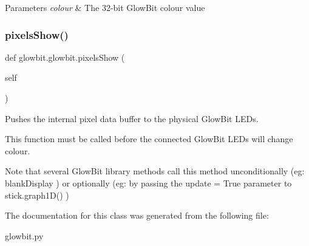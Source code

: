 \begin{DoxyParams}{Parameters}
{\em colour} & The 32-\/bit Glow\+Bit colour value \\
\hline
\end{DoxyParams}
\mbox{\label{classglowbit_1_1glowbit_a051aed2a4969fdcb0466e4e840209279}} 
\subsubsection{\texorpdfstring{pixels\+Show()}{pixelsShow()}}
{\footnotesize\ttfamily def glowbit.\+glowbit.\+pixels\+Show (\begin{DoxyParamCaption}\item[{}]{self }\end{DoxyParamCaption})}



Pushes the internal pixel data buffer to the physical Glow\+Bit L\+E\+Ds. 

This function must be called before the connected Glow\+Bit L\+E\+Ds will change colour.

Note that several Glow\+Bit library methods call this method unconditionally (eg\+: blank\+Display ) or optionally (eg\+: by passing the update = True parameter to stick.\+graph1\+D() ) 

The documentation for this class was generated from the following file\+:\begin{DoxyCompactItemize}
\item 
glowbit.\+py\end{DoxyCompactItemize}
